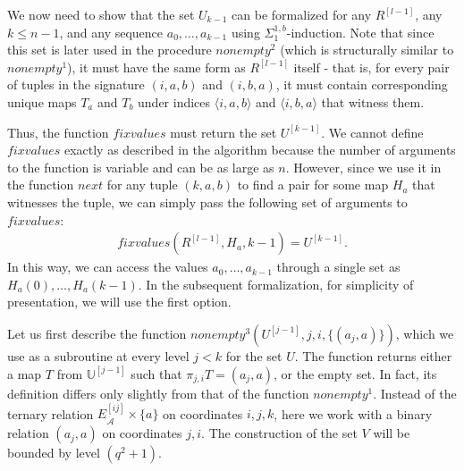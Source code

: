 \documentclass{article}
\theoremstyle{definition}
\theoremstyle{theorem}
\theoremstyle{theorem}
\theoremstyle{remark}
\theoremstyle{remark}
\theoremstyle{example}
\theoremstyle{notation}
\theoremstyle{theorem}
\begin{document}
We now need to show that the set $U_{k-1}$ can be formalized for any $R^{[l-1]}$, any $k \leq n - 1$, and any sequence $a_0, \ldots, a_{k-1}$ using $\Sigma^{1,b}_1$-induction. Note that since this set is later used in the procedure $nonempty^2$ (which is structurally similar to $nonempty^1$), it must have the same form as $R^{[l-1]}$ itself - that is, for every pair of tuples in the signature $(i, a, b)$ and $(i, b, a)$, it must contain corresponding unique maps $T_a$ and $T_b$ under indices $\langle i, a, b\rangle$ and $\langle i, b, a\rangle$ that witness them.

Thus, the function $fixvalues$ must return the set $U^{[k-1]}$. We cannot define $fixvalues$ exactly as described in the algorithm because the number of arguments to the function is variable and can be as large as $n$. However, since we use it in the function $next$ for any tuple $(k, a, b)$ to find a pair for some map $H_a$ that witnesses the tuple, we can simply pass the following set of arguments to $fixvalues$:
\begin{equation}
    \begin{gathered}
        fixvalues(R^{[l-1]}, H_a, k-1) = U^{[k-1]}.
    \end{gathered}
\end{equation}
In this way, we can access the values $a_0, \ldots, a_{k-1}$ through a single set as $H_a(0), \ldots, H_a(k-1)$. In the subsequent formalization, for simplicity of presentation, we will use the first option.


Let us first describe the function $nonempty^3(U^{[j-1]}, j, i, \{(a_j, a)\})$, which we use as a subroutine at every level $j < k$ for the set $U$. The function returns either a map $T$ from $\mathbb{U}^{[j-1]}$ such that $\pi_{j,i}T = (a_j, a)$, or the empty set. In fact, its definition differs only slightly from that of the function $nonempty^1$. Instead of the ternary relation $E^{[ij]}_{\ddot{\mathcal{A}}} \times \{a\}$ on coordinates $i, j, k$, here we work with a binary relation $(a_j, a)$ on coordinates $j, i$. The construction of the set $V$ will be bounded by level $(q^2 + 1)$.
\end{document}
